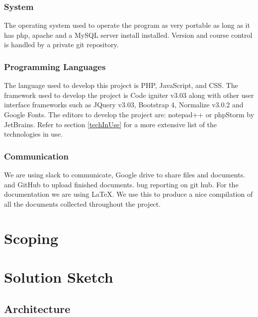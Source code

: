 \documentclass[12pt]{article}
\begin{document}
\subsubsection{System}

The operating system used to operate the program as very portable as long as it has php, apache and a MySQL server install installed.  Version and course control is handled by a private git repository. 

\subsubsection{Programming Languages}
The language used to develop this project is PHP, JavaScript, and CSS. The framework used to develop the project is Code igniter v3.03 along with other user interface frameworks such as JQuery v3.03, Bootstrap  4, Normalize v3.0.2  and Google Fonts. The editors to develop the project are: notepad++ or phpStorm by JetBrains. Refer to section \ref{techInUse} for a more extensive list of the technologies in use.

\subsubsection{Communication}

We are using slack to communicate, Google drive to share files and documents. and GitHub to upload finished documents. bug reporting on git hub. For the documentation we are using LaTeX. We use this to produce a nice compilation of all the documents collected throughout the project.  

\section{Scoping}


\section{Solution Sketch}

\subsection{Architecture}
\end{document}
